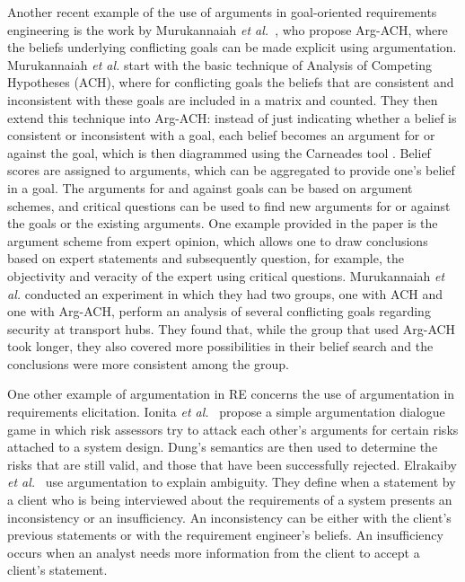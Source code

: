 Another recent example of the use of arguments in goal-oriented requirements engineering is the work by Murukannaiah \emph{et al.}~\cite{murukannaiah2015}, who propose Arg-ACH, where the beliefs underlying conflicting goals can be made explicit using argumentation. Murukannaiah \emph{et al.} start with the basic technique of Analysis of Competing Hypotheses (ACH), where for conflicting goals the beliefs that are consistent and inconsistent with these goals are included in a matrix and counted. They then extend this technique into Arg-ACH: instead of just indicating whether a belief is consistent or inconsistent with a goal, each belief becomes an argument for or against the goal, which is then diagrammed using the Carneades tool \cite{gordon2007visualizing}. Belief scores are assigned to arguments, which can be aggregated to provide one's belief in a goal. The arguments for and against goals can be based on argument schemes, and critical questions can be used to find new arguments for or against the goals or the existing arguments. One example provided in the paper is the argument scheme from expert opinion, which allows one to draw conclusions based on expert statements and subsequently question, for example, the objectivity and veracity of the expert using critical questions. Murukannaiah \emph{et al.} conducted an experiment in which they had two groups, one with ACH and one with Arg-ACH, perform an analysis of several conflicting goals regarding security at transport hubs. They found that, while the group that used Arg-ACH took longer, they also covered more possibilities in their belief search and the conclusions were more consistent among the group. 

One other example of argumentation in RE concerns the use of argumentation in requirements elicitation. Ionita \emph{et al.}~\cite{ionita2014argumentation} propose a simple argumentation dialogue game in which risk assessors try to attack each other's arguments for certain risks attached to a system design. Dung's semantics \cite{Dung1995} are then used to determine the risks that are still valid, and those that have been successfully rejected. Elrakaiby \emph{et al.}~\cite{ElrakaibyFSGN17} use argumentation to explain ambiguity. They define when a statement by a client who is being interviewed about the requirements of a system presents an inconsistency or an insufficiency. An inconsistency can be either with the client's previous statements or with the requirement engineer's beliefs. An insufficiency occurs when an analyst needs more information from the client to accept a client's statement.

